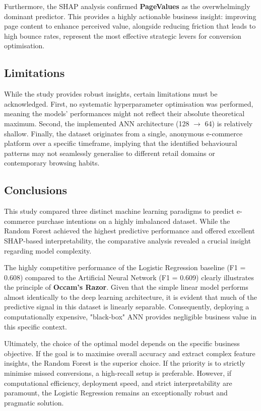 Furthermore, the SHAP analysis confirmed \textbf{PageValues} as the overwhelmingly dominant predictor. This provides a highly actionable business insight: improving page content to enhance perceived value, alongside reducing friction that leads to high bounce rates, represent the most effective strategic levers for conversion optimisation.

\subsection{Limitations}

While the study provides robust insights, certain limitations must be acknowledged. First, no systematic hyperparameter optimisation was performed, meaning the models' performances might not reflect their absolute theoretical maximum. Second, the implemented ANN architecture (128 $\rightarrow$ 64) is relatively shallow. Finally, the dataset originates from a single, anonymous e-commerce platform over a specific timeframe, implying that the identified behavioural patterns may not seamlessly generalise to different retail domains or contemporary browsing habits.

\subsection{Conclusions}

This study compared three distinct machine learning paradigms to predict e-commerce purchase intentions on a highly imbalanced dataset. While the Random Forest achieved the highest predictive performance and offered excellent SHAP-based interpretability, the comparative analysis revealed a crucial insight regarding model complexity.

The highly competitive performance of the Logistic Regression baseline (F1 = 0.608) compared to the Artificial Neural Network (F1 = 0.609) clearly illustrates the principle of \textbf{Occam's Razor}. Given that the simple linear model performs almost identically to the deep learning architecture, it is evident that much of the predictive signal in this dataset is linearly separable. Consequently, deploying a computationally expensive, "black-box" ANN provides negligible business value in this specific context.

Ultimately, the choice of the optimal model depends on the specific business objective. If the goal is to maximise overall accuracy and extract complex feature insights, the Random Forest is the superior choice. If the priority is to strictly minimise missed conversions, a high-recall setup is preferable. However, if computational efficiency, deployment speed, and strict interpretability are paramount, the Logistic Regression remains an exceptionally robust and pragmatic solution.